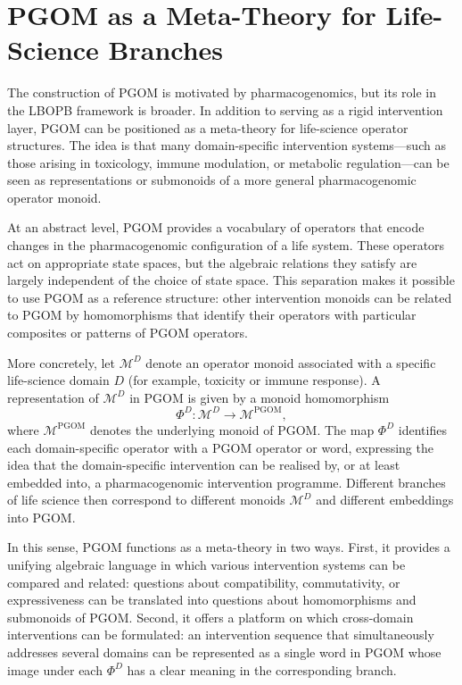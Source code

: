 \documentclass[11pt]{book}
\theoremstyle{plain}
\theoremstyle{definition}
\theoremstyle{remark}
\begin{document}
\section{PGOM as a Meta-Theory for Life-Science Branches}


The construction of PGOM is motivated by pharmacogenomics, but its
role in the LBOPB framework is broader. In addition to serving as a
rigid intervention layer, PGOM can be positioned as a meta-theory for
life-science operator structures. The idea is that many domain-specific
intervention systems—such as those arising in toxicology, immune
modulation, or metabolic regulation—can be seen as representations or
submonoids of a more general pharmacogenomic operator monoid.

At an abstract level, PGOM provides a vocabulary of operators that
encode changes in the pharmacogenomic configuration of a life system.
These operators act on appropriate state spaces, but the algebraic
relations they satisfy are largely independent of the choice of state
space. This separation makes it possible to use PGOM as a reference
structure: other intervention monoids can be related to PGOM by
homomorphisms that identify their operators with particular composites
or patterns of PGOM operators.

More concretely, let $\mathcal{M}^{D}$ denote an operator monoid
associated with a specific life-science domain $D$ (for example,
toxicity or immune response). A representation of $\mathcal{M}^{D}$ in
PGOM is given by a monoid homomorphism
\[
  \Phi^{D} \colon \mathcal{M}^{D} \longrightarrow \mathcal{M}^{\mathrm{PGOM}},
\]
where $\mathcal{M}^{\mathrm{PGOM}}$ denotes the underlying monoid of
PGOM. The map $\Phi^{D}$ identifies each domain-specific operator with
a PGOM operator or word, expressing the idea that the domain-specific
intervention can be realised by, or at least embedded into, a
pharmacogenomic intervention programme. Different branches of life
science then correspond to different monoids $\mathcal{M}^{D}$ and
different embeddings into PGOM.

In this sense, PGOM functions as a meta-theory in two ways. First, it
provides a unifying algebraic language in which various intervention
systems can be compared and related: questions about compatibility,
commutativity, or expressiveness can be translated into questions
about homomorphisms and submonoids of PGOM. Second, it offers a
platform on which cross-domain interventions can be formulated: an
intervention sequence that simultaneously addresses several domains can
be represented as a single word in PGOM whose image under each
$\Phi^{D}$ has a clear meaning in the corresponding branch.
\end{document}
